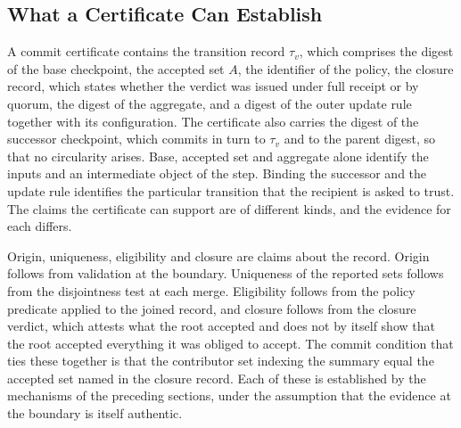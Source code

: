 \documentclass[11pt]{article}
\theoremstyle{definition}
\theoremstyle{remark}
\begin{document}
\subsection{What a Certificate Can Establish}

A commit certificate contains the transition record $\tau_v$, which comprises the digest of the base checkpoint, the accepted set $A$, the identifier of the policy, the closure record, which states whether the verdict was issued under full receipt or by quorum, the digest of the aggregate, and a digest of the outer update rule together with its configuration. The certificate also carries the digest of the successor checkpoint, which commits in turn to $\tau_v$ and to the parent digest, so that no circularity arises. Base, accepted set and aggregate alone identify the inputs and an intermediate object of the step. Binding the successor and the update rule identifies the particular transition that the recipient is asked to trust. The claims the certificate can support are of different kinds, and the evidence for each differs.

Origin, uniqueness, eligibility and closure are claims about the record. Origin follows from validation at the boundary. Uniqueness of the reported sets follows from the disjointness test at each merge. Eligibility follows from the policy predicate applied to the joined record, and closure follows from the closure verdict, which attests what the root accepted and does not by itself show that the root accepted everything it was obliged to accept. The commit condition that ties these together is that the contributor set indexing the summary equal the accepted set named in the closure record. Each of these is established by the mechanisms of the preceding sections, under the assumption that the evidence at the boundary is itself authentic.
\end{document}

